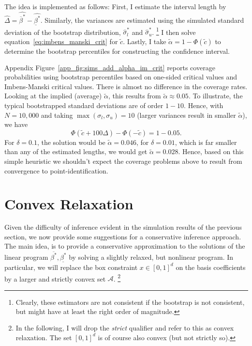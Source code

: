 \documentclass[12pt,a4paper,english]{article} %
\numberwithin{equation}{section}
\theoremstyle{definition}
\theoremstyle{remark}
\theoremstyle{plain}
\begin{document}
The idea is implemented as follows:
First, I estimate the interval length by $\hat{\Delta} = \hat{\overline{\beta}^*} - \hat{\underline{\beta}^*}$.
Similarly, the variances are estimated using the simulated standard deviation of the bootstrap distribution, $\hat{\sigma}_l^*$ and $\hat{\sigma}_u^*$.
\footnote{Clearly, these estimators are not consistent if the bootstrap is not consistent, but might have at least the right order of magnitude.}
I then solve equation~\ref{eq:imbens_manski_crit} for $\tilde{c}$.
Lastly, I take $\tilde{\alpha} = 1 - \Phi(\tilde{c})$ to determine the bootstrap percentiles for constructing the confidence interval.

Appendix Figure~\ref{app_fig:sims_add_alpha_im_crit} reports coverage probabilities using bootstrap percentiles based on one-sided critical values and Imbens-Manski critical values.
There is almost no difference in the coverage rates.
Looking at the implied (average) $\tilde{\alpha}$, this results from $\tilde{\alpha} \approx 0.05$.
To illustrate, the typical bootstrapped standard deviations are of order $1-10$.
Hence, with $N = 10,000$ and taking $\max(\sigma_l, \sigma_u)=10$ (larger variances result in smaller $\tilde{\alpha}$), we have
\begin{equation*}
  \Phi\left(\tilde{c} + 100\Delta\right) - \Phi\left(-\tilde{c}\right) = 1 - 0.05.
\end{equation*}
For $\delta=0.1$, the solution would be $\tilde{\alpha} = 0.046$, for $\delta=0.01$, which is far smaller than any of the estimated lengths, we would get $\tilde{\alpha} = 0.028$.
Hence, based on this simple heuristic we shouldn't expect the coverage problems above to result from convergence to point-identification.

\section{Convex Relaxation}
Given the difficulty of inference evident in the simulation results of the previous section, we now provide some suggestions for a conservative inference approach.
The main idea, is to provide a conservative approximation to the solutions of the linear program $\overline{\beta^*}, \underline{\beta^*}$ by solving a slightly relaxed, but nonlinear program.
In particular, we will replace the box constraint $x\in[0,1]^d$ on the basis coefficients by a larger and strictly convex set $\mathcal{A}$.
\footnote{In the following, I will drop the \textit{strict} qualifier and refer to this as convex relaxation. The set $[0,1]^d$ is of course also convex (but not strictly so).}
\end{document}
